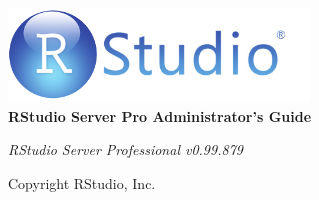 

\begin{titlepage}
\begin{center}

\includegraphics[width=0.6\textwidth]{images/rstudio.pdf}~\\[3cm]

{ \fontsize{35}{35}\selectfont \bfseries{RStudio Server Pro Administrator's Guide} \\[2cm] }

{ \large \emph{RStudio Server Professional v0.99.879} \\[1.5cm] }

\vfill

{ \small Copyright \textcopyright {} RStudio, Inc. }

\end{center}
\end{titlepage}
